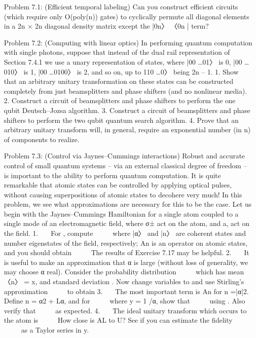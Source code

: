 \documentclass{article}
\newcommand{\0}{{$|0\rangle$}}
\newcommand{\1}{{$|1\rangle$}}
\newcommand{\2}{\frac{1}{\sqrt{2}}}
\begin{document}
Problem 7.1: (Efficient temporal labeling) Can you construct efficient circuits (which require only O(poly(n)) gates) to cyclically permute all diagonal elements in a 2n × 2n diagonal density matrix except the |0n〉 〈0n | term?

Problem 7.2: (Computing with linear optics) In performing quantum computation with single photons, suppose that instead of the dual rail representation of Section 7.4.1 we use a unary representation of states, where |00 …01〉 is 0, |00 …010〉 is 1, |00 …0100〉 is 2, and so on, up to 110 …0〉 being 2n – 1. 1. Show that an arbitrary unitary transformation on these states can be constructed completely from just beamsplitters and phase shifters (and no nonlinear media). 2. Construct a circuit of beamsplitters and phase shifters to perform the one qubit Deutsch–Jozsa algorithm. 3. Construct a circuit of beamsplitters and phase shifters to perform the two qubit quantum search algorithm. 4. Prove that an arbitrary unitary transform will, in general, require an exponential number (in n) of components to realize.

Problem 7.3: (Control via Jaynes–Cummings interactions) Robust and accurate control of small quantum systems – via an external classical degree of freedom – is important to the ability to perform quantum computation. It is quite remarkable that atomic states can be controlled by applying optical pulses, without causing superpositions of atomic states to decohere very much! In this problem, we see what approximations are necessary for this to be the case. Let us begin with the Jaynes–Cummings Hamiltonian for a single atom coupled to a single mode of an electromagnetic field, where σ± act on the atom, and a, act on the field. 1.    For , compute      where |α〉 and |n〉 are coherent states and number eigenstates of the field, respectively; An is an operator on atomic states, and you should obtain      The results of Exercise 7.17 may be helpful. 2.    It is useful to make an approximation that α is large (without loss of generality, we may choose α real). Consider the probability distribution      which has mean 〈n〉 = x, and standard deviation . Now change variables to and use Stirling’s approximation      to obtain 3.    The most important term is An for n =|α|2. Define n = α2 + Lα, and for      where y = 1 /α, show that      using . Also verify that      as expected. 4.    The ideal unitary transform which occurs to the atom is      How close is AL to U? See if you can estimate the fidelity      as a Taylor series in y.
\end{document}
